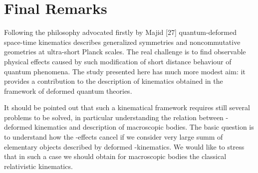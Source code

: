 \documentclass[a4paper,12pt]{article}
\begin{document}
\section{Final Remarks}
Following the philosophy advocated firstly by Majid [27]
quantum-deformed space-time kinematics describes generalized
symmetries and noncommutative geometries at ultra-short Planck
scales. The real challenge is to find observable physical effects
caused by such modification of short distance behaviour of quantum
phenomena. The study presented here has much more modest aim: it
provides a contribution to the description of kinematics obtained
in the framework of deformed quantum theories.

It should be pointed out that such a kinematical framework
requires still several problems to be solved, in particular
understanding the relation between \myHighlight{$\kappa$}\coordHE{}-deformed kinematics
and description of macroscopic bodies. The basic question is to
understand how the \myHighlight{$\kappa$}\coordHE{}-effects cancel if we consider very
large summ of elementary objects described by deformed
\myHighlight{$\kappa$}\coordHE{}-kinematics. We would like to stress that in such a case
we should obtain for macroscopic bodies the classical relativistic
kinematics.
\end{document}
